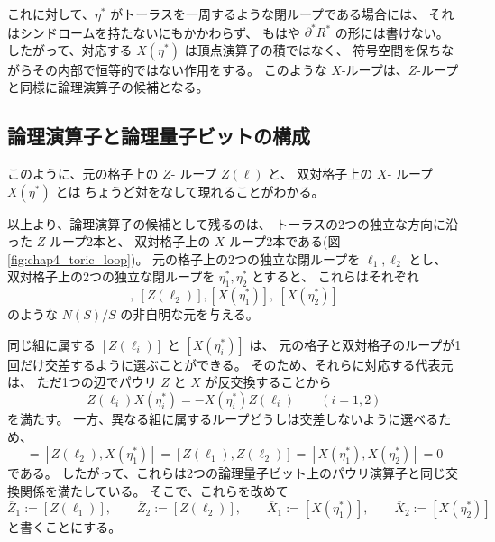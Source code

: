 \documentclass[../master.tex]{subfiles}
\begin{document}
これに対して、\(\eta^\ast\) がトーラスを一周するような閉ループである場合には、
それはシンドロームを持たないにもかかわらず、
もはや \(\partial^\ast R^\ast\) の形には書けない。
したがって、対応する \(X(\eta^\ast)\) は頂点演算子の積ではなく、
符号空間を保ちながらその内部で恒等的ではない作用をする。
このような \(X\)-ループは、\(Z\)-ループと同様に論理演算子の候補となる。

\subsection*{論理演算子と論理量子ビットの構成}
このように、元の格子上の \(Z\)- ループ \(Z(\ell)\) と、
双対格子上の \(X\)- ループ \(X(\eta^\ast)\) とは
ちょうど対をなして現れることがわかる。

以上より、論理演算子の候補として残るのは、
トーラスの2つの独立な方向に沿った \(Z\)-ループ2本と、
双対格子上の \(X\)-ループ2本である(図\ref{fig:chap4_toric_loop})。
元の格子上の2つの独立な閉ループを \(\ell_1,\ell_2\) とし、
双対格子上の2つの独立な閉ループを \(\eta_1^\ast,\eta_2^\ast\) とすると、
これらはそれぞれ
\begin{equation}
    [Z(\ell_1)],\ [Z(\ell_2)],
    [X(\eta_1^\ast)],\ [X(\eta_2^\ast)]
\end{equation}
のような \(N(S)/S\) の非自明な元を与える。

同じ組に属する \([Z(\ell_i)]\) と \([X(\eta_i^\ast)]\) は、
元の格子と双対格子のループが1回だけ交差するように選ぶことができる。
そのため、それらに対応する代表元は、
ただ1つの辺でパウリ \(Z\) と \(X\) が反交換することから
\begin{equation}
    Z(\ell_i)X(\eta_i^\ast)=-X(\eta_i^\ast)Z(\ell_i)
    \qquad (i=1,2)
\end{equation}
を満たす。
一方、異なる組に属するループどうしは交差しないように選べるため、
\begin{equation}
    [Z(\ell_1),X(\eta_2^\ast)]=
    [Z(\ell_2),X(\eta_1^\ast)]=
    [Z(\ell_1),Z(\ell_2)]=
    [X(\eta_1^\ast),X(\eta_2^\ast)]=0
\end{equation}
である。
したがって、これらは2つの論理量子ビット上のパウリ演算子と同じ交換関係を満たしている。
そこで、これらを改めて
\begin{equation}
    \overline{Z}_1 := [Z(\ell_1)],\qquad
    \overline{Z}_2 := [Z(\ell_2)],\qquad
    \overline{X}_1 := [X(\eta_1^\ast)],\qquad
    \overline{X}_2 := [X(\eta_2^\ast)]
\end{equation}
と書くことにする。
\end{document}
